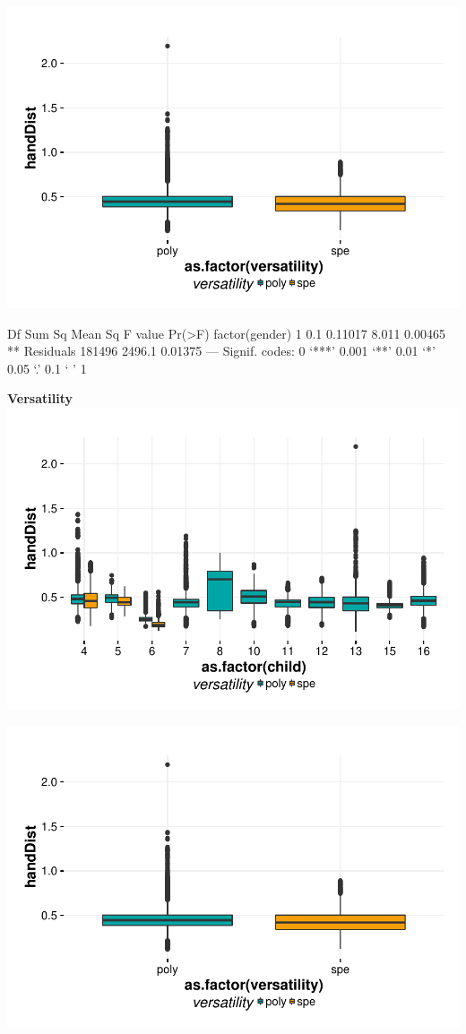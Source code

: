 \documentclass{article}
\begin{document}
\includegraphics{features-plot_handdistance_gender_quiz}

\begin{Schunk}
\begin{Soutput}
                   Df Sum Sq Mean Sq F value  Pr(>F)   
factor(gender)      1    0.1 0.11017   8.011 0.00465 **
Residuals      181496 2496.1 0.01375                   
---
Signif. codes:  0 ‘***’ 0.001 ‘**’ 0.01 ‘*’ 0.05 ‘.’ 0.1 ‘ ’ 1
\end{Soutput}
\end{Schunk}


\textbf{Versatility}
\includegraphics{features-plot_handdistance_child_versatility_quiz}

\includegraphics{features-plot_handdistance_gender_quiz}
\end{document}

